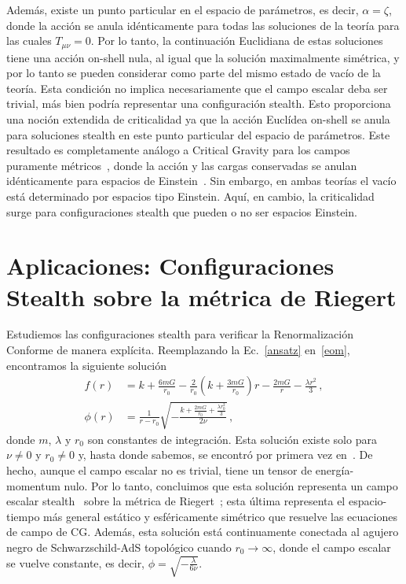 \documentclass[../Main.tex]{subfiles}
\begin{document}
Además, existe un punto particular en el espacio de parámetros, es decir, $\alpha=\zeta$, donde la acción se anula idénticamente para todas las soluciones de la teoría para las cuales $T_{\mu \nu}=0$. Por lo tanto, la continuación Euclidiana de estas soluciones tiene una acción on-shell nula, al igual que la solución maximalmente simétrica, y por lo tanto se pueden considerar como parte del mismo estado de vacío de la teoría. Esta condición no implica necesariamente que el campo escalar deba ser trivial, más bien podría representar una configuración stealth. Esto proporciona una noción extendida de criticalidad ya que la acción Euclídea on-shell se anula para soluciones stealth en este punto particular del espacio de parámetros. Este resultado es completamente análogo a Critical Gravity para los campos puramente métricos~\cite{Lu:2011zk}, donde la acción y las cargas conservadas se anulan idénticamente para espacios de Einstein~\cite{Miskovic:2014zja,Anastasiou:2017rjf}. Sin embargo, en ambas teorías el vacío está determinado por espacios tipo Einstein. Aquí, en cambio, la criticalidad surge para configuraciones stealth que pueden o no ser espacios Einstein.







\section{Aplicaciones: Configuraciones Stealth sobre la métrica de Riegert}
Estudiemos las configuraciones stealth para verificar la Renormalización Conforme de manera explícita. Reemplazando la Ec.~\eqref{ansatz} en~\eqref{eom}, encontramos la siguiente solución
\begin{subequations}\label{solution}
\begin{align}
    f(r) &= k + \frac{6mG}{r_0} - \frac{2}{r_0}\left(k+\frac{3mG}{r_0} \right)r - \frac{2mG}{r} - \frac{\lambda r^2}{3}\,,\\
    \phi(r) &= \frac{1}{r-r_0}\sqrt{-\frac{k+\frac{2mG}{r_0}+\frac{\lambda r_0^2}{3}}{2\nu}}\,,
\end{align}
\end{subequations}
donde $m$, $\lambda$ y $r_0$ son constantes de integración. Esta solución existe solo para $\nu\neq0$ y $r_0\neq0$ y, hasta donde sabemos, se encontró por primera vez en~\cite{Brihaye:2009ef}. De hecho, aunque el campo escalar no es trivial, tiene un tensor de energía-momentum nulo. Por lo tanto, concluimos que esta solución representa un campo escalar stealth~\cite{Ayon-Beato:2004nzi,Ayon-Beato:2005yoq,Hassaine:2006gz,Ayon-Beato:2013bsa} sobre la métrica de Riegert~\cite{Riegert:1984zz}; esta última representa el espacio-tiempo más general estático y esféricamente simétrico que resuelve las ecuaciones de campo de CG. Además, esta solución está continuamente conectada al agujero negro de Schwarzschild-AdS topológico cuando $r_0\to\infty$, donde el campo escalar se vuelve constante, es decir, $\phi=\sqrt{-\frac{\lambda}{6\nu}}$.
\end{document}
